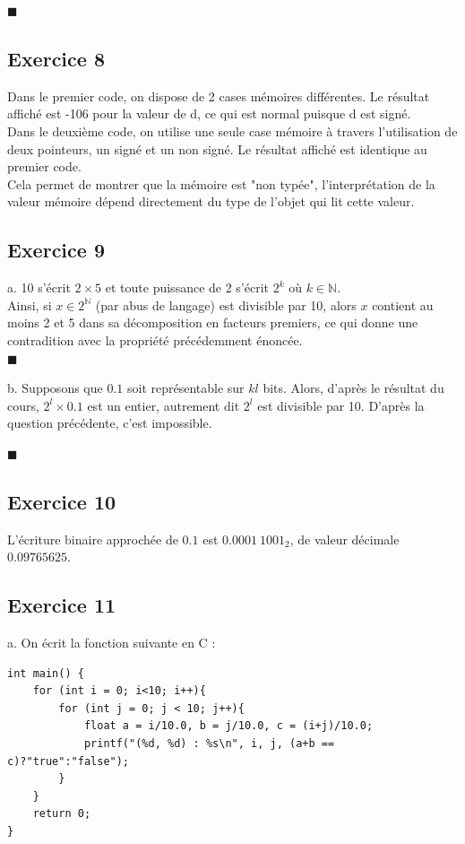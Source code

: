 \documentclass[11pt, a4 paper]{article}
\newcommand{\halmos}{\hfill$\blacksquare$}
\begin{document}
\halmos


\subsection{Exercice 8}
Dans le premier code, on dispose de 2 cases mémoires différentes. Le résultat affiché est -106 pour la valeur de d, ce qui est normal puisque d est signé.\\
Dans le deuxième code, on utilise une seule case mémoire à travers l'utilisation de deux pointeurs, un signé et un non signé. Le résultat affiché est identique au premier code.\\
Cela permet de montrer que la mémoire est "non typée", l'interprétation de la valeur mémoire dépend directement du type de l'objet qui lit cette valeur.

\subsection{Exercice 9}
a. 10 s'écrit $2\times5$ et toute puissance de 2 s'écrit $2^k$ où $k\in \mathbb{N}$.\\
Ainsi, si $x \in 2^{\mathbb{N}}$ (par abus de langage) est divisible par 10, alors $x$ contient au moins 2 et 5 dans sa décomposition en facteurs premiers, ce qui donne une contradition avec la propriété précédemment énoncée.\\

\halmos

b. Supposons que $0.1$ soit représentable sur $kl$ bits. Alors, d'après le résultat du cours, $2^l \times 0.1$ est un entier, autrement dit $2^l$ est divisible par 10. D'après la question précédente, c'est impossible.

\halmos

\subsection{Exercice 10}
L'écriture binaire approchée de $0.1$ est $0.0001~1001_2$, de valeur décimale $0.09765625$.

\subsection{Exercice 11}
a. On écrit la fonction suivante en C :

\begin{lstlisting}[style=CStyle]
int main() {
    for (int i = 0; i<10; i++){
        for (int j = 0; j < 10; j++){
            float a = i/10.0, b = j/10.0, c = (i+j)/10.0;
            printf("(%d, %d) : %s\n", i, j, (a+b == c)?"true":"false");
        }
    } 
    return 0;
}
\end{lstlisting}
\end{document}
